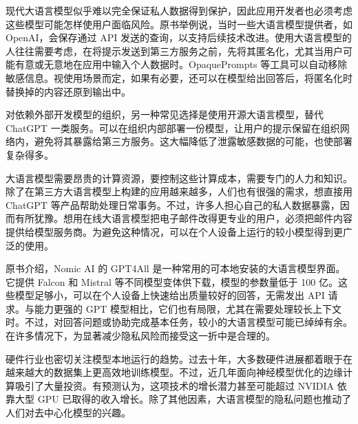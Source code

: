 现代大语言模型似乎难以完全保证私人数据得到保护，因此应用开发者也必须考虑这些模型可能怎样使用户面临风险。原书举例说，当时一些大语言模型提供者，如 OpenAI，会保存通过 API 发送的查询，以支持后续技术改进。使用大语言模型的人往往需要考虑，在将提示发送到第三方服务之前，先将其匿名化，尤其当用户可能有意或无意地在应用中输入个人数据时。OpaquePrompts 等工具可以自动移除敏感信息。视使用场景而定，如果有必要，还可以在模型给出回答后，将匿名化时替换掉的内容还原到输出中。

\begin{practicaltip}
对依赖外部开发模型的组织，另一种常见选择是使用开源大语言模型，替代 ChatGPT 一类服务。可以在组织内部部署一份模型，让用户的提示保留在组织网络内，避免将其暴露给第三方服务。这大幅降低了泄露敏感数据的可能，也使部署复杂得多。
\end{practicaltip}

大语言模型需要昂贵的计算资源，要控制这些计算成本，需要专门的人力和知识。除了在第三方大语言模型上构建的应用越来越多，人们也有很强的需求，想直接用 ChatGPT 等产品帮助处理日常事务。不过，许多人担心自己的私人数据暴露，因而有所犹豫。想用在线大语言模型把电子邮件改得更专业的用户，必须把邮件内容提供给模型服务商。为避免这种情况，可以在个人设备上运行的较小模型得到更广泛的使用。

\begin{practicaltip}
原书介绍，Nomic AI 的 GPT4All 是一种常用的可本地安装的大语言模型界面。它提供 Falcon 和 Mistral 等不同模型变体供下载，模型的参数量低于 100 亿。这些模型足够小，可以在个人设备上快速给出质量较好的回答，无需发出 API 请求。与能力更强的 GPT 模型相比，它们也有局限，尤其在需要处理较长上下文时。不过，对回答问题或协助完成基本任务，较小的大语言模型可能已绰绰有余。在许多情况下，为显著减少隐私风险而接受这一折中是合理的。
\end{practicaltip}

硬件行业也密切关注模型本地运行的趋势。过去十年，大多数硬件进展都着眼于在越来越大的数据集上更高效地训练模型。不过，近几年面向神经模型优化的边缘计算吸引了大量投资。有预测认为，这项技术的增长潜力甚至可能超过 NVIDIA 依靠大型 GPU 已取得的收入增长。除了其他因素，大语言模型的隐私问题也推动了人们对去中心化模型的兴趣。
